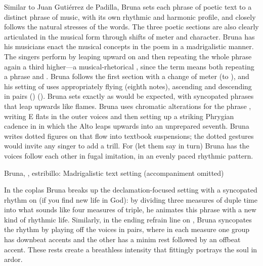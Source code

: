 
Similar to Juan Gutiérrez de Padilla, Bruna sets each phrase of poetic text to
a distinct phrase of music, with its own rhythmic and harmonic profile,
and closely follows the natural stresses of the words.  
The three poetic sections are also clearly articulated in the musical form
through shifts of meter and character.
Bruna has his musicians enact the musical concepts in the poem in a
madrigalistic manner.  
The singers perform  by leaping upward on
 and then repeating the whole phrase again a third higher---a
musical-rhetorical , since the term means both repeating a
phrase and .
Bruna follows the first section with a change of meter (to \meterC), and his
setting of  uses appropriately
flying  (eighth notes), ascending and descending in pairs
() ().
Bruna sets  exactly as would be expected, with
syncopated phrases that leap upwards like flames.
Bruna uses chromatic alterations for the phrase ,
writing E flats in the outer voices and then setting up a
striking Phrygian cadence in in which the Alto leaps upwards
into an unprepared seventh.  
Bruna writes dotted figures on  that flow into
textbook suspensions; the dotted gestures would invite any singer to add a
trill.
For  (let them say in turn) Bruna has the voices follow
each other in fugal imitation, in an evenly paced rhythmic pattern.


{Bruna, , estribillo: Madrigalistic text setting
(accompaniment omitted)}

In the coplas Bruna breaks up the declamation-focused setting with a syncopated
rhythm on  (if you find new life in God):
by dividing three measures of duple time into what sounds like four measures of
triple, he animates this phrase with a new kind of rhythmic life. 
Similarly, in the ending refrain line on , Bruna syncopates the
rhythm by playing off the voices in pairs, where in each measure one group has
downbeat accents and the other has a minim rest followed by an offbeat accent.
These rests create a breathless intensity that fittingly portrays the soul in
ardor.

